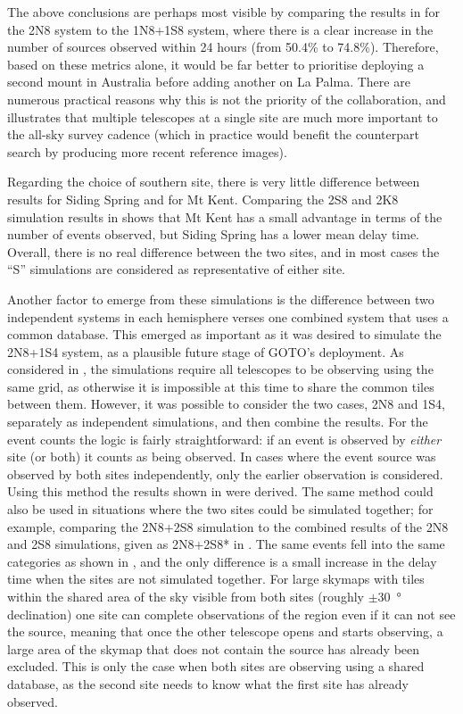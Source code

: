 \begin{colsection}
The above conclusions are perhaps most visible by comparing the results in  for the 2N8 system to the 1N8+1S8 system, where there is a clear increase in the number of sources observed within 24 hours (from 50.4\% to 74.8\%). Therefore, based on these metrics alone, it would be far better to prioritise deploying a second mount in Australia before adding another on La Palma. There are numerous practical reasons why this is not the priority of the collaboration, and  illustrates that multiple telescopes at a single site are much more important to the all-sky survey cadence (which in practice would benefit the counterpart search by producing more recent reference images).

Regarding the choice of southern site, there is very little difference between results for Siding Spring and for Mt Kent. Comparing the 2S8 and 2K8 simulation results in  shows that Mt Kent has a small advantage in terms of the number of events observed, but Siding Spring has a lower mean delay time. Overall, there is no real difference between the two sites, and in most cases the ``S'' simulations are considered as representative of either site.

Another factor to emerge from these simulations is the difference between two independent systems in each hemisphere verses one combined system that uses a common database. This emerged as important as it was desired to simulate the 2N8+1S4 system, as a plausible future stage of GOTO's deployment. As considered in , the simulations require all telescopes to be observing using the same grid, as otherwise it is impossible at this time to share the common tiles between them. However, it was possible to consider the two cases, 2N8 and 1S4, separately as independent simulations, and then combine the results. For the event counts the logic is fairly straightforward: if an event is observed by \emph{either} site (or both) it counts as being observed. In cases where the event source was observed by both sites independently, only the earlier observation is considered. Using this method the results shown in  were derived. The same method could also be used in situations where the two sites could be simulated together; for example, comparing the 2N8+2S8 simulation to the combined results of the 2N8 and 2S8 simulations, given as 2N8+2S8* in . The same events fell into the same categories as shown in , and the only difference is a small increase in the delay time when the sites are not simulated together. For large skymaps with tiles within the shared area of the sky visible from both sites (roughly $\pm$\SI{30}{\degree} declination) one site can complete observations of the region even if it can not see the source, meaning that once the other telescope opens and starts observing, a large area of the skymap that does not contain the source has already been excluded. This is only the case when both sites are observing using a shared database, as the second site needs to know what the first site has already observed.

\end{colsection}

